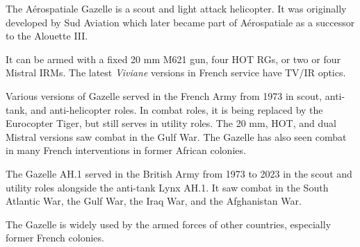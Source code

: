 

The Aérospatiale Gazelle is a scout and light attack helicopter. It was originally developed by Sud Aviation which later became part of Aérospatiale as a successor to the Alouette III.

It can be armed with a fixed 20 mm M621 gun, four HOT RGs, or two or four Mistral IRMs. The latest {\itshape Viviane} versions in French service have TV/IR optics.

Various versions of Gazelle served in the French Army from 1973 in scout, anti-tank, and anti-helicopter roles. In combat roles, it is being replaced by the Eurocopter Tiger, but still serves in utility roles. The 20 mm, HOT, and dual Mistral versions saw combat in the Gulf War. The Gazelle has also seen combat in many French interventions in former African colonies.

The Gazelle AH.1 served in the British Army from 1973 to 2023 in the scout and utility roles alongside the anti-tank Lynx AH.1. It saw combat in the South Atlantic War, the Gulf War, the Iraq War, and the Afghanistan War.

The Gazelle is widely used by the armed forces of other countries, especially former French colonies.
